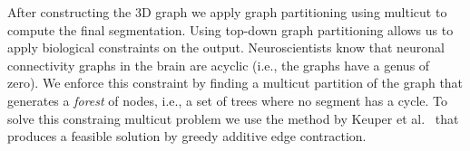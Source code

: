 After constructing the 3D graph we apply graph partitioning using multicut to compute the final segmentation. Using top-down graph partitioning allows us to apply biological constraints on the output. Neuroscientists know that neuronal connectivity graphs in the brain are acyclic (i.e., the graphs have a genus of zero). We enforce this constraint by finding a multicut partition of the graph that generates a \textit{forest} of nodes, i.e., a set of trees where no segment has a cycle. To solve this constraing multicut problem we use the method by Keuper et al.~\cite{keuper2015efficient} that produces a feasible solution by greedy additive edge contraction. 
